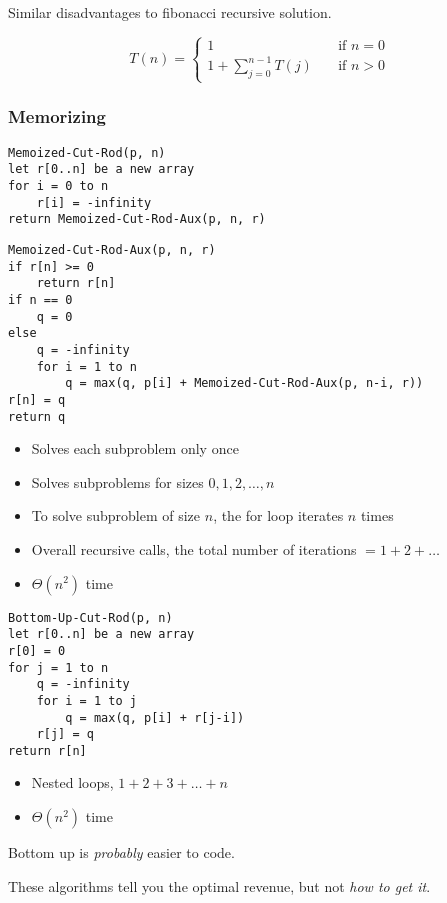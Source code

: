 \documentclass{article}
\begin{document}
Similar disadvantages to fibonacci recursive solution.

\begin{equation*}
    T(n) = \begin{cases}
        1 \quad                         & \text{if } n = 0 \\
        1 + \sum_{j=0}^{n-1} T(j) \quad & \text{if } n > 0
    \end{cases}
\end{equation*}

\subsubsection*{Memorizing}
\begin{verbatim}
Memoized-Cut-Rod(p, n)
let r[0..n] be a new array
for i = 0 to n
    r[i] = -infinity
return Memoized-Cut-Rod-Aux(p, n, r)
\end{verbatim}

\begin{verbatim}
Memoized-Cut-Rod-Aux(p, n, r)
if r[n] >= 0
    return r[n]
if n == 0
    q = 0
else
    q = -infinity
    for i = 1 to n
        q = max(q, p[i] + Memoized-Cut-Rod-Aux(p, n-i, r))
r[n] = q
return q
\end{verbatim}

\begin{itemize}
    \item Solves each subproblem only once
    \item Solves subproblems for sizes \(0, 1, 2, \ldots, n\)
    \item To solve subproblem of size $n$, the for loop iterates $n$ times
    \item Overall recursive calls, the total number of iterations \(= 1 + 2 + \ldots\)
    \item \(\Theta(n^2)\) time
\end{itemize}

\begin{verbatim}
Bottom-Up-Cut-Rod(p, n)
let r[0..n] be a new array
r[0] = 0
for j = 1 to n
    q = -infinity
    for i = 1 to j
        q = max(q, p[i] + r[j-i])
    r[j] = q
return r[n]
\end{verbatim}

\begin{itemize}
    \item Nested loops, \(1 + 2 + 3 + \ldots + n\)
    \item \(\Theta(n^2)\) time
\end{itemize}

Bottom up is \emph{probably} easier to code.

These algorithms tell you the optimal revenue, but not \emph{how to get it}.
\end{document}
